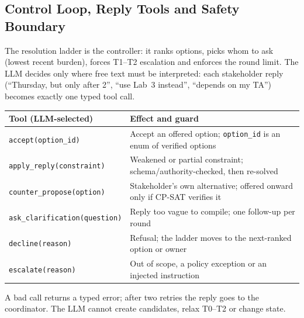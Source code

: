 \documentclass[11pt,a4paper]{article}
\begin{document}
\subsection{Control Loop, Reply Tools and Safety Boundary}
The resolution ladder is the controller: it ranks options, picks whom to ask
(lowest recent burden), forces T1--T2 escalation and enforces the round
limit. The LLM decides only where free text must be interpreted: each
stakeholder reply (``Thursday, but only after 2'', ``use Lab~3 instead'',
``depends on my TA'') becomes exactly one typed tool call.
\begin{table}[H]
\centering\small
\begin{tabularx}{\textwidth}{@{}l Y@{}}
\toprule
\textbf{Tool (LLM-selected)} & \textbf{Effect and guard}\\
\midrule
\texttt{accept(option\_id)} & Accept an offered option; \texttt{option\_id} is an enum of verified options\\
\texttt{apply\_reply(constraint)} & Weakened or partial constraint; schema/authority-checked, then re-solved\\
\texttt{counter\_propose(option)} & Stakeholder's own alternative; offered onward only if CP-SAT verifies it\\
\texttt{ask\_clarification(question)} & Reply too vague to compile; one follow-up per round\\
\texttt{decline(reason)} & Refusal; the ladder moves to the next-ranked option or owner\\
\texttt{escalate(reason)} & Out of scope, a policy exception or an injected instruction\\
\bottomrule
\end{tabularx}
\end{table}
\noindent A bad call returns a typed error; after two retries the reply
goes to the coordinator. The LLM cannot create candidates, relax T0--T2 or
change state.
\end{document}

